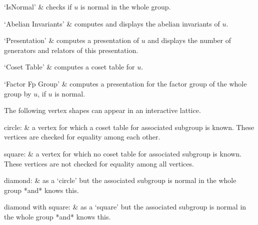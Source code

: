 `IsNormal' &
checks  if $u$ is  normal  in the  whole group.

`Abelian Invariants' &
computes  and  displays  the  abelian invariants  of  $u$.

`Presentation' &
computes a presentation of $u$ and displays  the number of generators and
relators   of   this presentation.

`Coset Table' &
computes   a   coset table for   $u$.

`Factor Fp Group' &
computes a presentation  for the factor group  of the whole group by $u$,
if $u$ is normal.
\enditems



The following vertex shapes can appear in an interactive lattice.

\beginitems
circle: &
    a vertex for which  a coset table for  associated subgroup is  known.
    These vertices are checked for equality among each other.

square: &
    a vertex for which  no coset table for  associated subgroup is known.
    These vertices are not checked for equality among all vertices.

diamond: &
    as  a `circle' but   the associated subgroup  is  normal in the whole
    group *and* {\GAP} knows this.

diamond with square: &
    as a  `square'  but the associated subgroup  is  normal in  the whole
    group *and* {\GAP} knows this.
\enditems

